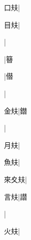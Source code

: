 \begin{multicols}{2}
{{\cjk{}{\cnsym{}　}口{\cnxa{}㚘}}\mktsJzrVerticalBar{}{\cjk{}{\cnsym{}　}{\cnsym{}　}{\cnsym{}　}}|{}\par
{\cjk{}{\cnsym{}　}目{\cnxa{}㚘}}\mktsJzrVerticalBar{}{\cjk{}{\cnsym{}　}{\cnsym{}　}{\cnsym{}　}}|{}\par
{}\mktsJzrVerticalBar{}{\cjk{}{\cnsym{}　}{\cnsym{}　}{\cnsym{}　}}|{}\par
{}\mktsJzrVerticalBar{}{\cjk{}{\cnsym{}　}{\cnsym{}　}{\cnsym{}　}}|{\cjk{}簮}\par
{}\mktsJzrVerticalBar{}{\cjk{}{\cnsym{}　}{\cnsym{}　}{\cnsym{}　}}|{\cjk{}僣}\par
{}\mktsJzrVerticalBar{}{\cjk{}{\cnsym{}　}{\cnsym{}　}{\cnsym{}　}}|{}\par
{\cjk{}{\cnsym{}　}金{\cnxa{}㚘}}\mktsJzrVerticalBar{}{\cjk{}{\cnsym{}　}{\cnsym{}　}{\cnsym{}　}}|{\cjk{}鐟}\par
{}\mktsJzrVerticalBar{}{\cjk{}{\cnsym{}　}{\cnsym{}　}{\cnsym{}　}}|{}\par
{\cjk{}{\cnsym{}　}月{\cnxa{}㚘}}\mktsJzrVerticalBar{}{\cjk{}{\cnsym{}　}{\cnsym{}　}{\cnsym{}　}}|{}\par
{\cjk{}{\cnsym{}　}魚{\cnxa{}㚘}}\mktsJzrVerticalBar{}{\cjk{}{\cnsym{}　}{\cnsym{}　}{\cnsym{}　}}|{}\par
{\cjk{}來夊{\cnxa{}㚘}}\mktsJzrVerticalBar{}{\cjk{}{\cnsym{}　}{\cnsym{}　}{\cnsym{}　}}|{}\par
{\cjk{}{\cnsym{}　}言{\cnxa{}㚘}}\mktsJzrVerticalBar{}{\cjk{}{\cnsym{}　}{\cnsym{}　}{\cnsym{}　}}|{\cjk{}譛}\par
{}\mktsJzrVerticalBar{}{\cjk{}{\cnsym{}　}{\cnsym{}　}{\cnsym{}　}}|{}\par
{\cjk{}{\cnsym{}　}火{\cnxa{}㚘}}\mktsJzrVerticalBar{}{\cjk{}{\cnsym{}　}{\cnsym{}　}{\cnsym{}　}}|{}\par
}
\end{multicols}
